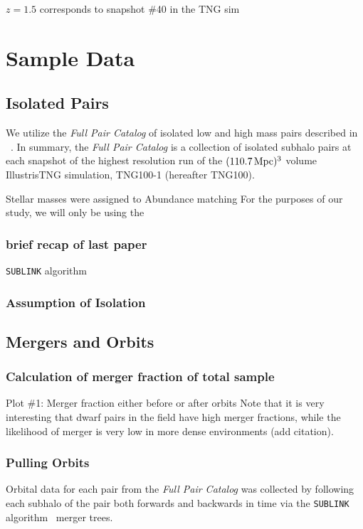 \documentclass[twocolumn]{aastex631}
\newcommand{\paircat}{\textit{Full Pair Catalog}}
\begin{document}
$z=1.5$ corresponds to snapshot \#40 in the TNG sim


\section{Sample Data}

\subsection{Isolated Pairs}
We utilize the \paircat{} of isolated low and high mass pairs described in ~\citet{Chamberlain2024}. 
In summary, the \paircat{} is a collection of isolated subhalo pairs at each snapshot of the highest resolution run of the $(110.7\,\mathrm{Mpc})^3$ volume IllustrisTNG simulation, TNG100-1 (hereafter TNG100). 

Stellar masses were assigned to Abundance matching 
For the purposes of our study, we will only be using the 


\subsubsection{brief recap of last paper}
\texttt{SUBLINK} algorithm~\citep{RG2015}

\subsubsection{Assumption of Isolation}

\subsection{Mergers and Orbits}
\subsubsection{Calculation of merger fraction of total sample}
Plot \#1: Merger fraction either before or after orbits
Note that it is very interesting that dwarf pairs in the field have high merger fractions, while the likelihood of merger is very low in more dense environments (add citation).



\subsubsection{Pulling Orbits}
Orbital data for each pair from the \paircat{} was collected by following each subhalo of the pair both forwards and backwards in time via the \texttt{SUBLINK} algorithm~\citep{RG2015} merger trees.
\end{document}

